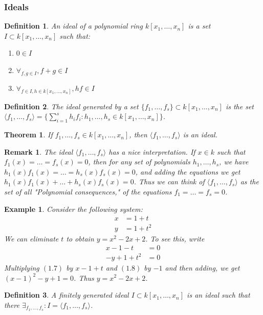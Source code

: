 \documentclass[oneside]{book}
\theoremstyle{mystyle}
\newtheorem{theorem}{Theorem}[section]
\newtheorem{definition}{Definition}[section]
\newtheorem{example}{Example}[section]
\newtheorem{remark}{Remark}[section]
\begin{document}
\subsubsection{Ideals}
\begin{definition}
An ideal of a polynomial ring $k[x_1,\hdots ,x_n]$ is a set $I\subset k[x_1,\hdots ,x_n]$ such that:
\begin{enumerate}
    \item $0\in I$
    \item $\forall_{f,g\in I}, f+g\in I$ 
    \item $\forall_{f\in I, h\in k[x_1,\hdots ,x_n]}, hf\in I$
\end{enumerate}
\end{definition}
\begin{definition}
The ideal generated by a set $\{f_1,\hdots, f_s\} \subset k[x_1,\hdots ,x_n]$ is the set $\langle f_1,\hdots, f_s\rangle = \{\sum_{i=1}^{s} h_i f_i:h_1,\hdots, h_s\in k[x_1,\hdots ,x_n]\}$.
\end{definition}
\begin{theorem}
If $f_1,\hdots, f_s\in k[x_1,\hdots ,x_n]$, then $\langle f_1,\hdots, f_s\rangle$ is an ideal.
\end{theorem}
\begin{remark}
The ideal $\langle f_1,\hdots, f_s\rangle$ has a nice interpretation. If $x\in k$ such that $f_1(x) = \hdots = f_s(x) = 0$, then for any set of polynomials $h_1,\hdots, h_s$, we have $h_1(x)f_1(x) = \hdots = h_s(x)f_s(x) = 0$, and adding the equations we get $h_1(x)f_1(x)+\hdots + h_s(x)f_s(x) = 0$. Thus we can think of $\langle f_1,\hdots, f_s\rangle$ as the set of all "Polynomial consequences," of the equations $f_1 = \hdots = f_s = 0$.
\end{remark}
\begin{example}
Consider the following system:
\begin{align*}
    x &= 1+t \\
    y &= 1+t^2
\end{align*}
We can eliminate $t$ to obtain $y = x^2-2x+2$. To see this, write
\begin{align*}
    x - 1 - t &= 0 \\
    -y+1+t^2 &=0
\end{align*}
Multiplying $(1.7)$ by $x-1+t$ and $(1.8)$ by $-1$ and then adding, we get $(x-1)^2-y+1 = 0$. Thus $y = x^2-2x+2$.
\end{example}
\begin{definition}
A finitely generated ideal $I\subset k[x_1,\hdots ,x_n]$ is an ideal such that there $\exists_{f_1,\hdots, f_s}: I = \langle f_1,\hdots, f_s\rangle$.
\end{definition}
\end{document}
